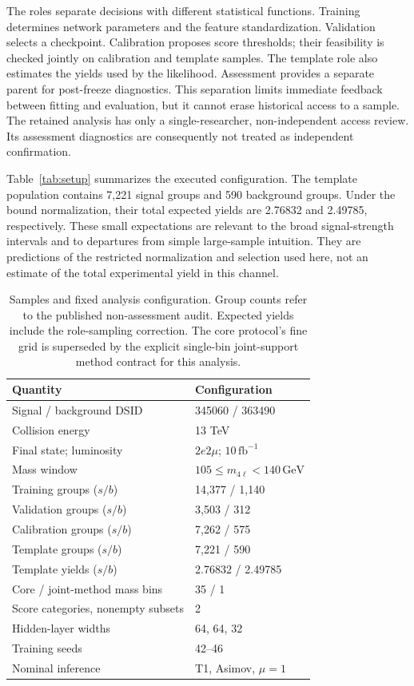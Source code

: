 \documentclass[aps,prd,reprint,superscriptaddress,nofootinbib,longbibliography,floatfix]{revtex4-2}
\let\label\OriginalLaTeXLabel
\newcommand{\mfl}{m_{4\ell}}
\newcommand{\GeV}{\,\mathrm{GeV}}
\begin{document}
The roles separate decisions with different statistical functions.
Training determines network parameters and the feature standardization.
Validation selects a checkpoint. Calibration proposes score thresholds;
their feasibility is checked jointly on calibration and template samples.
The template role also estimates the yields used by the likelihood. Assessment
provides a separate parent for post-freeze diagnostics. This separation
limits immediate feedback between fitting and evaluation, but it cannot
erase historical access to a sample. The retained analysis has only a
single-researcher, non-independent access review. Its assessment diagnostics
are consequently not treated as independent confirmation.

Table~\ref{tab:setup} summarizes the executed configuration. The template
population contains 7,221 signal groups and 590 background groups. Under the
bound normalization, their total expected yields are 2.76832 and 2.49785,
respectively. These small expectations are relevant to the broad
signal-strength intervals and to departures from simple large-sample
intuition. They are predictions of the restricted normalization and selection
used here, not an estimate of the total experimental yield in this channel.

\begin{table}[!htbp]
\caption{Samples and fixed analysis configuration. Group counts refer to the
published non-assessment audit. Expected yields include the role-sampling
correction. The core protocol's fine grid is superseded by the explicit
single-bin joint-support method contract for this analysis.}
\label{tab:setup}
\begin{ruledtabular}
\begin{tabular}{ll}
Quantity & Configuration \\
\hline
Signal / background DSID & 345060 / 363490 \\
Collision energy & 13 TeV \\
Final state; luminosity & $2e2\mu$; $10\,\mathrm{fb}^{-1}$ \\
Mass window & $105\leq\mfl<140\GeV$ \\
Training groups ($s/b$) & 14,377 / 1,140 \\
Validation groups ($s/b$) & 3,503 / 312 \\
Calibration groups ($s/b$) & 7,262 / 575 \\
Template groups ($s/b$) & 7,221 / 590 \\
Template yields ($s/b$) & 2.76832 / 2.49785 \\
Core / joint-method mass bins & 35 / 1 \\
Score categories, nonempty subsets & 2 \\
Hidden-layer widths & 64, 64, 32 \\
Training seeds & 42--46 \\
Nominal inference & T1, Asimov, $\mu=1$ \\
\end{tabular}
\end{ruledtabular}
\end{table}
\end{document}
